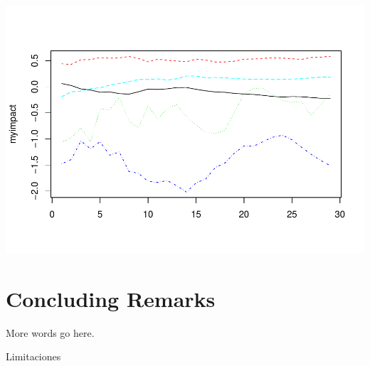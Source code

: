 \documentclass[]{elsarticle} %
\makeatletter
\def\maxwidth{\ifdim\Gin@nat@width>\linewidth\linewidth
\else\Gin@nat@width\fi}
\let\Oldincludegraphics\includegraphics
\renewcommand{\includegraphics}[1]{\Oldincludegraphics[width=\maxwidth]{#1}}
\makeatother
\begin{document}
\includegraphics{Environmental-Correlates-of-COVID19-Spain_files/figure-latex/impacts-1.pdf}

\hypertarget{concluding-remarks}{%
\section{Concluding Remarks}\label{concluding-remarks}}

More words go here.

Limitaciones
\end{document}
